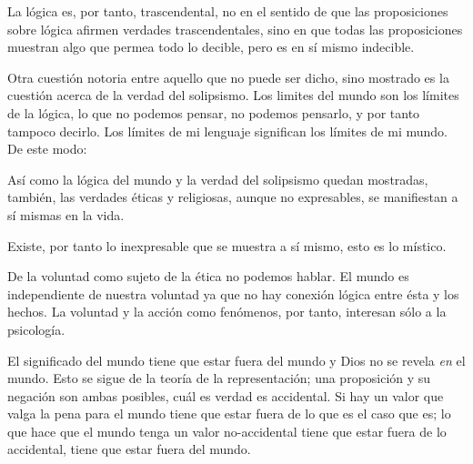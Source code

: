       La lógica es, por tanto, trascendental, no en el sentido de que las
      proposiciones sobre lógica afirmen verdades trascendentales, sino en que todas
      las proposiciones muestran algo que permea todo lo decible, pero es en sí mismo
      indecible.\autocite[cf.~][p.~166 \S2]{anscombe1959iwt}

      Otra cuestión notoria entre aquello que no puede ser dicho, sino mostrado es la
      cuestión acerca de la verdad del solipsismo. Los limites del mundo son los
      límites de la lógica, lo que no podemos pensar, no podemos pensarlo, y por tanto
      tampoco decirlo. Los límites de mi lenguaje significan los límites de mi
      mundo.\autocite[cf~.][5.6~y~5.61]{wittgenstein1922tractatus} De este modo:

      Así como la lógica del mundo y la verdad del solipsismo quedan mostradas,
      también, las verdades éticas y religiosas, aunque no expresables, se manifiestan
      a sí mismas en la vida.

      Existe, por tanto lo inexpresable que se muestra a sí mismo, esto es lo
      místico.\autocite[cf.~][6.522]{wittgenstein1922tractatus}

      De la voluntad como sujeto de la ética no podemos
      hablar\autocite[cf.~][6.423]{wittgenstein1922tractatus}. El mundo es independiente de nuestra
      voluntad ya que no hay conexión lógica entre ésta y los hechos.
      La voluntad y la acción como fenómenos, por tanto, interesan sólo a la
      psicología.\autocite[cf.~][p.171 \S3]{anscombe1959iwt}

      El significado del mundo tiene que estar fuera del
      mundo\autocite[cf.~][6.41]{wittgenstein1922tractatus} y Dios no se revela \emph{en} el
      mundo\autocite[cf.~][6.432]{wittgenstein1922tractatus}.
      Esto se sigue de la teoría de la representación; una proposición y su negación
      son ambas posibles, cuál es verdad es accidental.\autocite[cf.~][p.170 \S4]{anscombe1959iwt}
      Si hay un valor que valga la pena para el mundo tiene que estar fuera de lo que
      es el caso que es; lo que hace que el mundo tenga un valor no-accidental tiene
      que estar fuera de lo accidental, tiene que estar fuera del
      mundo.\autocite[cf.~][6.41]{wittgenstein1922tractatus}

